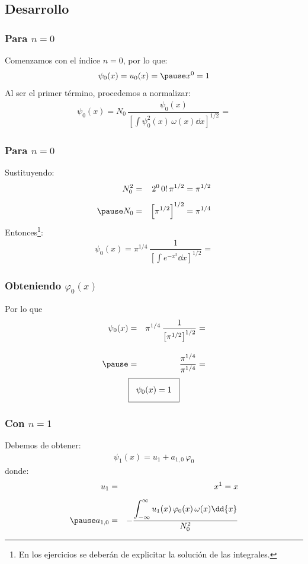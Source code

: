 \subsection{Desarrollo}
\begin{frame}
\frametitle{Para $n = 0$}
Comenzamos con el índice $n = 0$, por lo que:
\begin{eqnarray*}
\psi_{0}(x) = u_{0} (x) = \pause x^{0} =  1
\end{eqnarray*}
\pause
Al ser el primer término, procedemos a normalizar:
\begin{align*}
\psi_{0} (x) = N_{0} \, \dfrac{\psi_{0}(x)}{\left[ \displaystyle \int \psi_{0}^{2} (x) \, \omega (x) \dd{x} \right]^{1/2}} =
\end{align*}
\end{frame}
\begin{frame}
\frametitle{Para $n = 0$}
Sustituyendo:
\begin{eqnarray*}
N_{0}^{2} &=& 2^{0} \, 0! \, \pi^{1/2} = \pi^{1/2} \\[0.5em] \pause
N_{0} &=& \left[ \pi^{1/2} \right]^{1/2} = \pi^{1/4}
\end{eqnarray*}
\pause
Entonces\footnote<3->{En los ejercicios se deberán de explicitar la solución de las integrales.}:
\begin{align*}
\psi_{0} (x) = \pi^{1/4} \, \dfrac{1}{\left[ \displaystyle \int e^{-x^{2}} \dd{x} \right]^{1/2}} =
\end{align*}
\end{frame}
\begin{frame}
\frametitle{Obteniendo $\varphi_{0} (x)$}
Por lo que
\begin{eqnarray*}
\psi_{0} (x) &=& \pi^{1/4} \, \dfrac{1}{\left[ \pi^{1/2} \right]^{1/2}} = \\[1em] \pause
&=& \dfrac{\pi^{1/4}}{\pi^{1/4}} =
\end{eqnarray*}
\pause
\begin{align*}
\setlength{\fboxsep}{3\fboxsep}\boxed{
\psi_{0} (x) = 1}
\end{align*}
\end{frame}
\begin{frame}
\frametitle{Con $n = 1$}
Debemos de obtener:
\begin{align*}
\psi_{1} (x) = u_{1} + a_{1,0} \, \varphi_{0}
\end{align*}
\pause
donde:
\begin{eqnarray*}
u_{1} &=& x^{1} = x \\[0.5em] \pause
a_{1,0} &=& - \dfrac{\displaystyle \int_{-\infty}^{\infty} u_{1}(x) \, \varphi_{0} (x) \, \omega (x) \dd{x}}{N_{0}^{2}}
\end{eqnarray*}
\end{frame}
